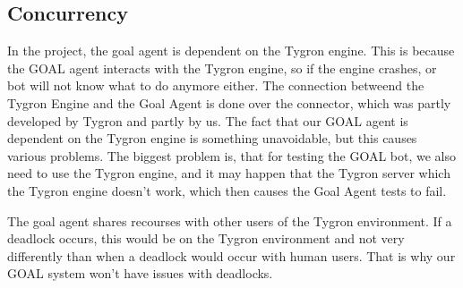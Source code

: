 \subsection{Concurrency}
In the project, the goal agent is dependent on the Tygron engine. This is because the GOAL agent interacts with the Tygron engine, so if the engine crashes, or bot will not know what to do anymore either. The connection betweend the Tygron Engine and the Goal Agent is done over the connector, which was partly developed by Tygron and partly by us. The fact that our GOAL agent is dependent on the Tygron engine is something unavoidable, but this causes various problems. The biggest problem is, that for testing the GOAL bot, we also need to use the Tygron engine, and it may happen that the Tygron server which the Tygron engine doesn't work, which then causes the Goal Agent tests to fail.

The goal agent shares recourses with other users of the Tygron environment. If a deadlock occurs, this would be on the Tygron environment and not very differently than when a deadlock would occur with human users. That is why our GOAL system won't have issues with deadlocks.
\newpage
